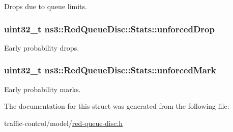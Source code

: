 Drops due to queue limits. 

\subsubsection[{\texorpdfstring{unforced\+Drop}{unforcedDrop}}]{\setlength{\rightskip}{0pt plus 5cm}uint32\+\_\+t ns3\+::\+Red\+Queue\+Disc\+::\+Stats\+::unforced\+Drop}\hypertarget{structns3_1_1RedQueueDisc_1_1Stats_a242027f6eb7d30e2cd636c52080e2c73}{}\label{structns3_1_1RedQueueDisc_1_1Stats_a242027f6eb7d30e2cd636c52080e2c73}


Early probability drops. 

\subsubsection[{\texorpdfstring{unforced\+Mark}{unforcedMark}}]{\setlength{\rightskip}{0pt plus 5cm}uint32\+\_\+t ns3\+::\+Red\+Queue\+Disc\+::\+Stats\+::unforced\+Mark}\hypertarget{structns3_1_1RedQueueDisc_1_1Stats_aa974fb3ee97c612e0a6d77259a3672df}{}\label{structns3_1_1RedQueueDisc_1_1Stats_aa974fb3ee97c612e0a6d77259a3672df}


Early probability marks. 



The documentation for this struct was generated from the following file\+:\begin{DoxyCompactItemize}
\item 
traffic-\/control/model/\hyperlink{red-queue-disc_8h}{red-\/queue-\/disc.\+h}\end{DoxyCompactItemize}
